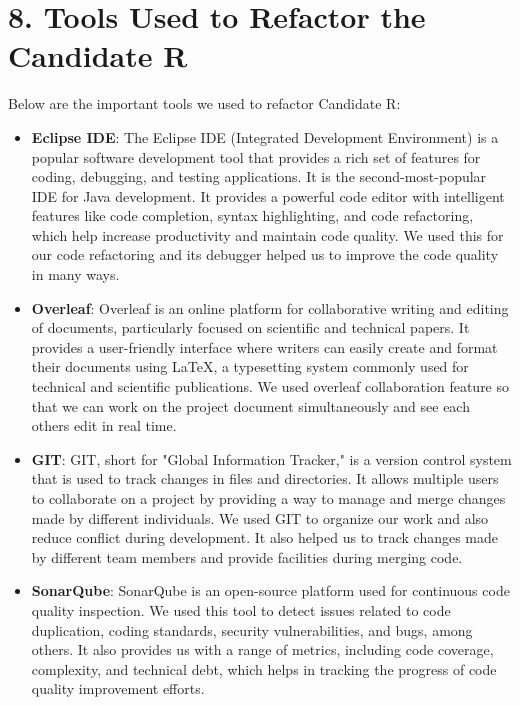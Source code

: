 \documentclass[12pt,letterpaper]{report}
\begin{document}
\section*{8. Tools Used to Refactor the Candidate R}
\normalsize{

Below are the important tools we used to refactor Candidate R:\\
\begin{itemize}
    \item \textbf{Eclipse IDE}: The Eclipse IDE (Integrated Development Environment) is a popular software development tool that provides a rich set of features for coding, debugging, and testing applications. It is the second-most-popular IDE for Java development. It provides a powerful code editor with intelligent features like code completion, syntax highlighting, and code refactoring, which help increase productivity and maintain code quality. We used this for our code refactoring and its debugger helped us to improve the code quality in many ways.

    \item \textbf{Overleaf}: Overleaf is an online platform for collaborative writing and editing of documents, particularly focused on scientific and technical papers. It provides a user-friendly interface where writers can easily create and format their documents using LaTeX, a typesetting system commonly used for technical and scientific publications. We used overleaf collaboration feature so that we can work on the project document simultaneously and see each others edit in real time. 

    \item \textbf{GIT}: GIT, short for "Global Information Tracker," is a version control system that is used to track changes in files and directories. It allows multiple users to collaborate on a project by providing a way to manage and merge changes made by different individuals. We used GIT to organize our work and also reduce conflict during development. It also helped us to track changes made by different team members and provide facilities during merging code.

    \item \textbf{SonarQube}: SonarQube is an open-source platform used for continuous code quality inspection. We used this tool to detect issues related to code duplication, coding standards, security vulnerabilities, and bugs, among others. It also provides us with a range of metrics, including code coverage, complexity, and technical debt, which helps in tracking the progress of code quality improvement efforts.


\end{itemize}}
\end{document}
